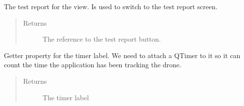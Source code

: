 \documentclass[letterpaper,10pt,english]{sphinxmanual}
\begin{document}
\begin{fulllineitems}
\begin{fulllineitems}
\begin{quote}
\begin{description}
\end{description}\end{quote}

\end{fulllineitems}


\begin{fulllineitems}
\label{\detokenize{index:src.Views.View_LoadingScreen.LoadingWindow.set_BtnTestReport}}
The test report for the view. Is used to switch to the test report screen.
\begin{quote}\begin{description}
\item[{Returns}] \leavevmode
The reference to the test report button.

\end{description}\end{quote}

\end{fulllineitems}


\begin{fulllineitems}
\label{\detokenize{index:src.Views.View_LoadingScreen.LoadingWindow.set_LblStatus}}
Getter property for the timer label. We need to attach a QTimer to it so it can count the time the
application has been tracking the drone.
\begin{quote}\begin{description}
\item[{Returns}] \leavevmode
The timer label

\end{description}\end{quote}

\end{fulllineitems}



\end{fulllineitems}
\end{document}
